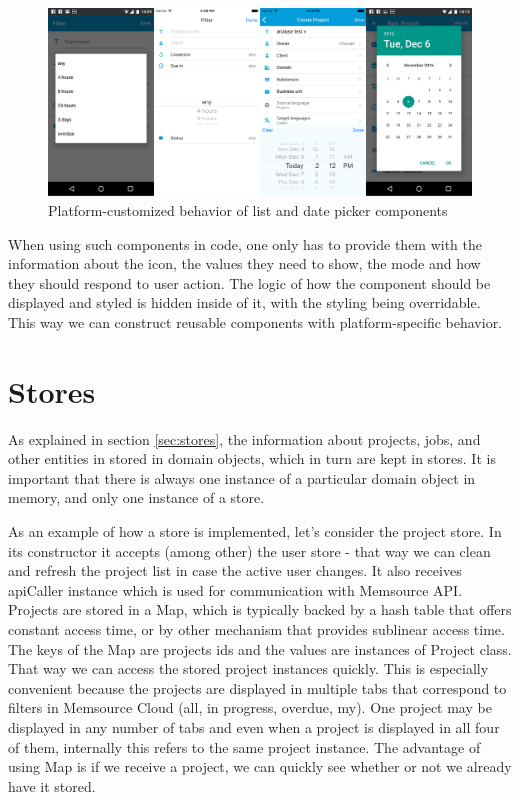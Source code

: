 \begin{figure}[H]
	\includegraphics[width=1\textwidth]{pics/components}
	\caption{Platform-customized behavior of list and date picker components}
	\label{components}
\end{figure}


When using such components in code, one only has to provide them with the information about the icon, the values they need to show, the mode and how they should respond to user action. The logic of how the component should be displayed and styled is hidden inside of it, with the styling being overridable. This way we can construct reusable components with platform-specific behavior.



\section{Stores}

As explained in section \ref{sec:stores}, the information about projects, jobs, and other entities in stored in domain objects, which in turn are kept in stores. It is important that there is always one instance of a particular domain object in memory, and only one instance of a store.

As an example of how a store is implemented, let's consider the project store. In its constructor it accepts (among other) the user store - that way we can clean and refresh the project list in case the active user changes. It also receives apiCaller instance which is used for communication with Memsource API. Projects are stored in a Map, which is typically backed by a hash table that offers constant access time, or by other mechanism that provides sublinear access time. The keys of the Map are projects ids and the values are instances of Project class. That way we can access the stored project instances quickly. This is especially convenient because the projects are displayed in multiple tabs that correspond to filters in Memsource Cloud (all, in progress, overdue, my). One project may be displayed in any number of tabs and even when a project is displayed in all four of them, internally this refers to the same project instance. The advantage of using Map is if we receive a project, we can quickly see whether or not we already have it stored.


